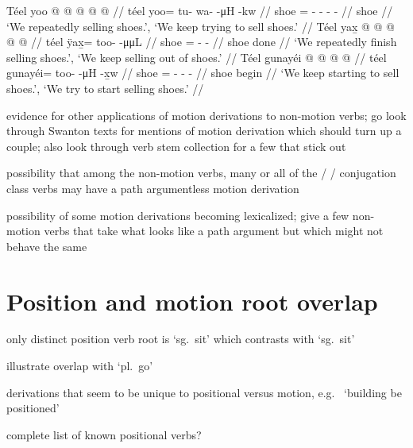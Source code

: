 \documentclass[12pt,letterpaper,oneside,article]{memoir}
\begin{document}
\pex\label{ex:motderiv-beyond-sell-repimpfv}%
\a\label{ex:motderiv-beyond-sell-repimpfv-plain}%
%
\begingl
	\gla	Téel yoo @  @ {} @ {} @ {} @ {} //
	\glb	téel yoo= tu- wa-  -μH -kw //
	\glc	shoe = - -  - - //
	\gld	shoe \•  {} {} {} {} //
	\glft	‘We repeatedly selling shoes.’, ‘We keep trying to sell shoes.’
		//
\endgl
\a\label{ex:motderiv-beyond-sell-impfv-term}%
%
\begingl
	\gla	Téel yax̱ @  @ {} @ {} @ {} @ {} //
	\glb	téel ÿax̱= too-  -μμL //
	\glc	shoe = -  - //
	\gld	shoe done\·  {} {} {} {} //
	\glft	‘We repeatedly finish selling shoes.’, ‘We keep selling out of shoes.’
		//
\endgl
\a\label{ex:motderiv-beyond-sell-impfv-incep}%
%
\begingl
	\gla	Téel g̱unayéi @  @ {} @ {} @ {} //
	\glb	téel g̱unayéi= too-  -μH -x̱w //
	\glc	shoe = -  - - //
	\gld	shoe begin\·  {} {} {} //
	\glft	‘We keep starting to sell shoes.’, ‘We try to start selling shoes.’
		//
\endgl
\xe



evidence for other applications of motion derivations to non-motion verbs; go look through Swanton texts for mentions of motion derivation which should turn up a couple; also look through verb stem collection for a few that stick out

possibility that among the non-motion verbs, many or all of the  /  /  conjugation class verbs may have a path argumentless motion derivation

possibility of some motion derivations becoming lexicalized; give a few non-motion verbs that take what looks like a path argument but which might not behave the same

\clearpage
\section{Position and motion root overlap}\label{sec:motposroot}

only distinct position verb root is  ‘sg.\ sit’ which contrasts with  ‘sg.\ sit’

illustrate overlap with  ‘pl.\ go’

derivations that seem to be unique to positional versus motion, e.g.\  ‘building be positioned’

complete list of known positional verbs?

\clearpage
\raggedyright
\printbibliography\label{sec:bibliography} 
\end{document}
